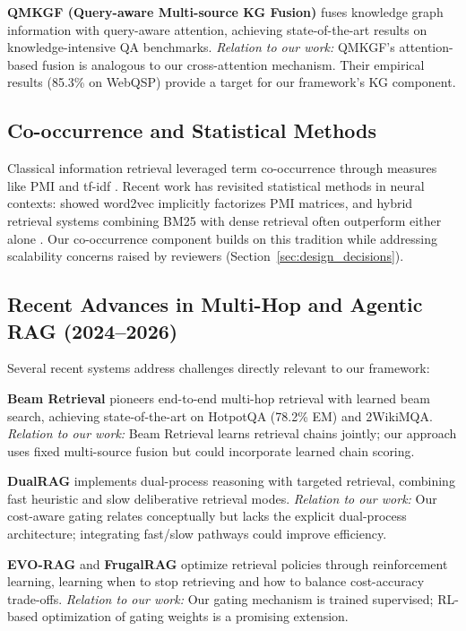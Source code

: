 \documentclass[11pt,a4paper]{article}
\begin{document}
\textbf{QMKGF (Query-aware Multi-source KG Fusion)} \citep{qmkgf2024} fuses knowledge graph information with query-aware attention, achieving state-of-the-art results on knowledge-intensive QA benchmarks. \textit{Relation to our work:} QMKGF's attention-based fusion is analogous to our cross-attention mechanism. Their empirical results (85.3\% on WebQSP) provide a target for our framework's KG component.

\subsection{Co-occurrence and Statistical Methods}

Classical information retrieval leveraged term co-occurrence through measures like PMI and tf-idf \citep{manning2008introduction}. Recent work has revisited statistical methods in neural contexts: \citet{levy2014neural} showed word2vec implicitly factorizes PMI matrices, and hybrid retrieval systems combining BM25 with dense retrieval often outperform either alone \citep{ma2023hybrid}. Our co-occurrence component builds on this tradition while addressing scalability concerns raised by reviewers (Section~\ref{sec:design_decisions}).

\subsection{Recent Advances in Multi-Hop and Agentic RAG (2024--2026)}

Several recent systems address challenges directly relevant to our framework:

\textbf{Beam Retrieval} \citep{beam2024} pioneers end-to-end multi-hop retrieval with learned beam search, achieving state-of-the-art on HotpotQA (78.2\% EM) and 2WikiMQA. \textit{Relation to our work:} Beam Retrieval learns retrieval chains jointly; our approach uses fixed multi-source fusion but could incorporate learned chain scoring.

\textbf{DualRAG} \citep{dualrag2025} implements dual-process reasoning with targeted retrieval, combining fast heuristic and slow deliberative retrieval modes. \textit{Relation to our work:} Our cost-aware gating relates conceptually but lacks the explicit dual-process architecture; integrating fast/slow pathways could improve efficiency.

\textbf{EVO-RAG} \citep{evorag2025} and \textbf{FrugalRAG} \citep{frugalrag2025} optimize retrieval policies through reinforcement learning, learning when to stop retrieving and how to balance cost-accuracy trade-offs. \textit{Relation to our work:} Our gating mechanism is trained supervised; RL-based optimization of gating weights is a promising extension.
\end{document}
